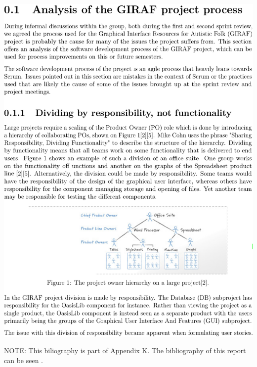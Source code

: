 \noindent\includegraphics[page=6,width=1\textwidth]{part_appendix/sw601f15.pdf}\clearpage{}

\noindent\textsf{NOTE:} This biliography is part of Appendix K\@. The bibliography of this report can be seen .
\vspace{1cm}

